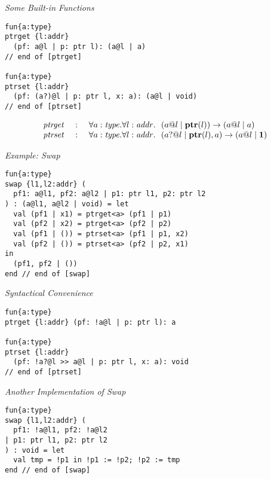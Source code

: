 \documentclass[pdf]{prosper}
\begin{document}
\def\tptr{\mbox{\bf ptr}}
\def\fptrget{{\it ptrget}}
\def\fptrset{{\it ptrset}}
\begin{slide}{\em Some Built-in Functions}
{\blue\begin{verbatim}
fun{a:type}
ptrget {l:addr}
  (pf: a@l | p: ptr l): (a@l | a)
// end of [ptrget]

fun{a:type}
ptrset {l:addr}
  (pf: (a?)@l | p: ptr l, x: a): (a@l | void)
// end of [ptrset]
\end{verbatim}
}
\[\begin{array}{rcl}
\fptrget &~:~& \forall a:\stype.\forall l:\saddr.~~(a@l \mid \tptr(l)) \timp (a@l \mid a) \\
\fptrset &~:~& \forall a:\stype.\forall l:\saddr.~~(a?@l \mid \tptr(l), a)\timp (a@l \mid \tunit) \\
\end{array}\]
\end{slide}
\begin{slide}{\em Example: {\it Swap}}
{\blue\begin{verbatim}
fun{a:type}
swap {l1,l2:addr} (
  pf1: a@l1, pf2: a@l2 | p1: ptr l1, p2: ptr l2
) : (a@l1, a@l2 | void) = let
  val (pf1 | x1) = ptrget<a> (pf1 | p1)
  val (pf2 | x2) = ptrget<a> (pf2 | p2)
  val (pf1 | ()) = ptrset<a> (pf1 | p1, x2)
  val (pf2 | ()) = ptrset<a> (pf2 | p2, x1)
in
  (pf1, pf2 | ())
end // end of [swap]
\end{verbatim}
}
\end{slide}
\begin{slide}{\em Syntactical Convenience}
{\blue\begin{verbatim}
fun{a:type}
ptrget {l:addr} (pf: !a@l | p: ptr l): a

fun{a:type}
ptrset {l:addr}
  (pf: !a?@l >> a@l | p: ptr l, x: a): void
// end of [ptrset]
\end{verbatim}
}
\end{slide}
\begin{slide}{\em Another Implementation of {\it Swap}}
{\blue\begin{verbatim}
fun{a:type}
swap {l1,l2:addr} (
  pf1: !a@l1, pf2: !a@l2
| p1: ptr l1, p2: ptr l2
) : void = let
  val tmp = !p1 in !p1 := !p2; !p2 := tmp
end // end of [swap]
\end{verbatim}
}
\end{slide}
\def\varrayView{{\it array\_v}}
\def\cArrayNil{{\it array\_v\_nil}}
\end{document}
